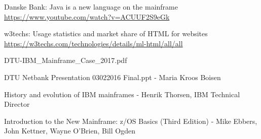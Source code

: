 \begin{thebibliography}{9}
Danske Bank: Java is a new language on the mainframe\\
\url{https://www.youtube.com/watch?v=ACUUF2S9eGk}

w3techs: Usage statistics and market share of HTML for websites \\
\url{https://w3techs.com/technologies/details/ml-html/all/all}

DTU-IBM\_Mainframe\_Case\_2017.pdf

DTU Netbank Presentation 03022016 Final.ppt - Maria Kroos Boisen

History and evolution of IBM mainframes - Henrik Thorsen, IBM Technical Director

Introduction to the New Mainframe: z/OS Basics (Third Edition) - Mike Ebbers, John Kettner, Wayne O’Brien, Bill Ogden

\end{thebibliography}

